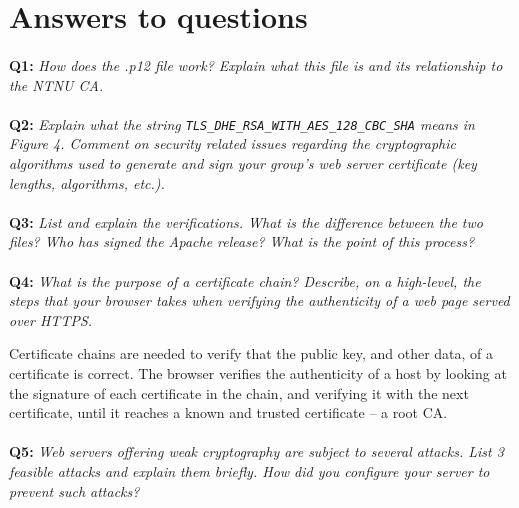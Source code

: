 \section{Answers to questions}

\paragraph{}
\textbf{Q1:}
\textit{How does the .p12 file work? Explain what this file is and its relationship to the NTNU CA.}

\paragraph{}
\textbf{Q2:}
\cprotect\textit{Explain what the string \verb/TLS_DHE_RSA_WITH_AES_128_CBC_SHA/ means in Figure 4. Comment on security related issues regarding the cryptographic algorithms used to generate and sign your group's web server certificate (key lengths, algorithms, etc.).}

\paragraph{}
\textbf{Q3:}
\textit{List and explain the verifications. What is the difference between the two files? Who has signed the Apache release? What is the point of this process?}

\paragraph{}
\textbf{Q4:}
\textit{What is the purpose of a certificate chain? Describe, on a high-level, the steps that your browser takes when verifying the authenticity of a web page served over HTTPS.}

Certificate chains are needed to verify that the public key, and other data, of a certificate is correct.
The browser verifies the authenticity of a host by looking at the signature of each certificate in the chain, and verifying it with the next certificate, until it reaches a known and trusted certificate – a root CA.\cite{x509}

\paragraph{}
\textbf{Q5:}
\textit{Web servers offering weak cryptography are subject to several attacks. List 3 feasible attacks and explain them briefly. How did you configure your server to prevent such attacks?}


